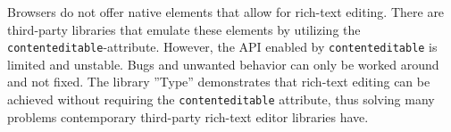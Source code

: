 % 
% 
%
Browsers do not offer native elements that allow for rich-text editing. There are third-party libraries that emulate these elements by utilizing the \texttt{contenteditable}-attribute. However, the API enabled by \texttt{contenteditable} is limited and unstable. Bugs and unwanted behavior can only be worked around and not fixed. The library ''Type'' demonstrates that rich-text editing can be achieved without requiring the \texttt{contenteditable} attribute, thus solving many problems contemporary third-party rich-text editor libraries have.
